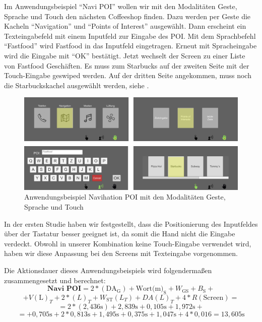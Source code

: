 Im Anwendungsbeispiel "`Navi POI"' wollen wir mit den Modalitäten Geste, Sprache und Touch den nächsten Coffeeshop finden. 
Dazu werden per Geste die Kacheln "`Navigation"' und "`Points of Interest"' ausgewählt. 
Dann erscheint ein Texteingabefeld mit einem Inputfeld zur Eingabe des POI. 
Mit dem Sprachbefehl "`Fastfood"' wird Fastfood in das Inputfeld eingetragen. 
Erneut mit Spracheingabe wird die Eingabe mit "`OK"' bestätigt. 
Jetzt wechselt der Screen zu einer Liste von Fastfood Geschäften. 
Es muss zum Starbucks auf der zweiten Seite mit der Touch-Eingabe geswiped werden. 
Auf der dritten Seite angekommen, muss noch die Starbuckskachel ausgewählt werden, siehe .  
\begin{figure}
	\centering
		\includegraphics[width=1\textwidth]{img/UseCases_Eval_Navi_POI.jpg}
	\caption{Anwendungsbeispiel Navihation POI mit den Modalitäten Geste, Sprache und Touch}
	\label{fig:UseCasesEvalNaviPOI}
\end{figure}

In der ersten Studie haben wir festgestellt, dass die Positionierung des Inputfeldes über der Tastatur besser geeignet ist, da somit die Hand nicht die Eingabe verdeckt. Obwohl in unserer Kombination keine Touch-Eingabe verwendet wird, haben wir diese Anpassung bei den Screens mit Texteingabe vorgenommen.

Die Aktionsdauer dieses Anwendungsbeispiels wird folgendermaßen zusammengesetzt und berechnet:
\[	
\textbf{Navi POI} = 2*(\text{DA}_\text{G}) + \text{Wort(m)}_\text{S} + W_\text{GS} + B_\text{S} + 
\]
\[	
+ V(\text{L})_T + 2*(L)_T + W_\text{ST}(L_T) + DA(L)_T + 4*R(\text{Screen}) =
\]
\[
= 2*( 2,436\text{s}) + 2,839\text{s} + 0,105\text{s} + 1,972\text{s} + 
\]
\[
= + 0,705\text{s} + 2*0,813\text{s} + 1,495\text{s} + 0,375\text{s} + 1,047\text{s} + 4*0,016= 13,605\text{s}
\]

